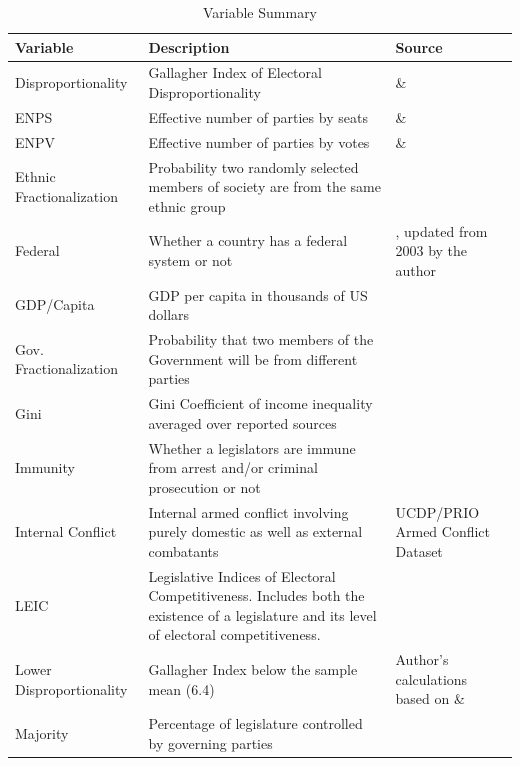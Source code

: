 \documentclass[a4paper]{article}\usepackage[]{graphicx}\usepackage[]{color}
\begin{document}
\begin{table}[!h]
    \small
    \begin{center}
    \caption{Variable Summary}
    \label{var_summary}
    \begin{tabular}{l m{7cm} m{3.5cm}}

            \hline
            Variable & Description & Source \\
            \hline \hline
            Disproportionality & Gallagher Index of Electoral Disproportionality & \cite{Gallagher2012} \& \cite{Carey2011} \\
            ENPS & Effective number of parties by seats & \cite{Gallagher2012} \& \cite{Carey2011} \\
            ENPV & Effective number of parties by votes & \cite{Gallagher2012} \& \cite{Carey2011} \\
            Ethnic Fractionalization & Probability two randomly selected members of society are from the same ethnic group & \cite{Alesina2003} \\
            Federal & Whether a country has a federal system or not & \cite{Carey2011}, updated from 2003 by the author \\
            GDP/Capita & GDP per capita in thousands of US dollars & \cite{WorldBank2011} \\
            Gov. Fractionalization & Probability that two members of the Government will be from different parties & \cite{DPI2001} \\
            Gini & Gini Coefficient of income inequality averaged over reported sources & \cite{UNU2008} \\
            Immunity & Whether a legislators are immune from arrest and/or criminal prosecution or not & \cite{Fish2009} \\
            Internal Conflict & Internal armed conflict involving purely domestic as well as external combatants & UCDP/PRIO Armed Conflict Dataset \citep{Themner2014} \\
            LEIC & Legislative Indices of Electoral Competitiveness. Includes both the existence of a legislature and its level of electoral competitiveness. & \cite{DPI2001} \\
            Lower Disproportionality & Gallagher Index below the sample mean (6.4) & Author's calculations based on \cite{Gallagher2012} \& \cite{Carey2011}\\
            Majority & Percentage of legislature controlled by governing parties & \cite{DPI2001} \\

\end{tabular}
\end{center}
\end{table}
\end{document}
